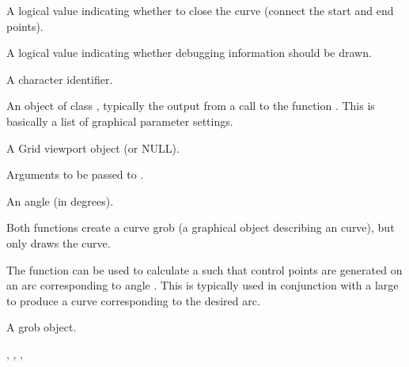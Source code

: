 \begin{Arguments}
\begin{ldescription}
\item[\code{open}] A logical value indicating whether to close the curve
(connect the start and end points).
\item[\code{debug}] A logical value indicating whether debugging
information should be drawn.
\item[\code{name}]  A character identifier. 
\item[\code{gp}] An object of class , typically the output
from a call to the function .  This is basically
a list of graphical parameter settings.
\item[\code{vp}] A Grid viewport object (or NULL).
\item[\code{...}] Arguments to be passed to .
\item[\code{theta}] An angle (in degrees).
\end{ldescription}
\end{Arguments}
%
\begin{Details}\relax
Both functions create a curve grob (a graphical object describing an
curve), but only 
draws the curve.

The  function can be used to calculate a
 such that control points are generated on
an arc corresponding to angle .  This is typically
used in conjunction with a large  to produce a curve
corresponding to the desired arc.
\end{Details}
%
\begin{Value}
A grob object.
\end{Value}
%
\begin{SeeAlso}\relax
{},
,
,
\end{SeeAlso}
%
